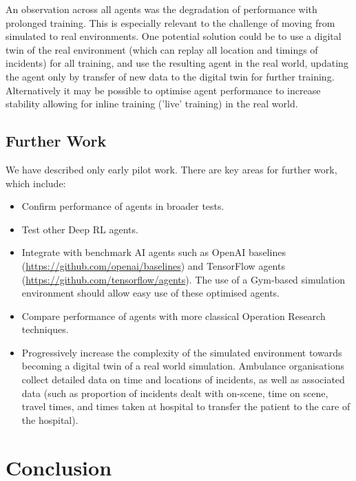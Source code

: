 \documentclass{article}
\begin{document}
An observation across all agents was the degradation of performance with prolonged training. This is especially relevant to the challenge of moving from simulated to real environments. One potential solution could be to use a digital twin of the real environment (which can replay all location and timings of incidents) for all training, and use the resulting agent in the real world, updating the agent only by transfer of new data to the digital twin for further training. Alternatively it may be possible to optimise agent performance to increase stability allowing for inline training ('live' training) in the real world.

\subsection{Further Work}

We have described only early pilot work. There are key areas for further work, which include:

\begin{itemize}

    \item Confirm performance of agents in broader tests.
    
    \item Test other Deep RL agents.
    
    \item Integrate with benchmark AI agents such as OpenAI baselines (\url{https://github.com/openai/baselines}) and TensorFlow agents (\url{https://github.com/tensorflow/agents}). The use of a Gym-based simulation environment should allow easy use of these optimised agents.
    
    \item Compare performance of agents with more classical Operation Research techniques.
    
    \item Progressively increase the complexity of the simulated environment towards becoming a digital twin of a real world simulation. Ambulance organisations collect detailed data on time and locations of incidents, as well as associated data (such as proportion of incidents dealt with on-scene, time on scene, travel times, and times taken at hospital to transfer the patient to the care of the hospital). 
    
\end{itemize}


\section{Conclusion}
\end{document}
